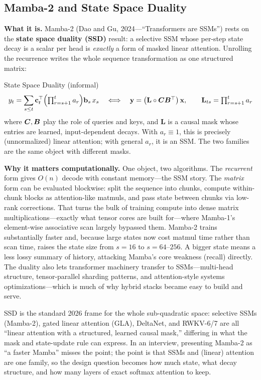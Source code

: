 \subsection{Mamba-2 and State Space Duality}
\label{subsec:mamba2_ssd}

\textbf{What it is.} Mamba-2 (Dao and Gu, 2024---``Transformers are SSMs'') rests on the \textbf{state space duality (SSD)} result: a selective SSM whose per-step state decay is a scalar per head is \textit{exactly} a form of masked linear attention. Unrolling the recurrence writes the whole sequence transformation as one structured matrix:

\begin{mathresult}{State Space Duality (informal)}
\begin{equation}
y_t = \sum_{s \le t} \mathbf{c}_t^{\top} \Bigl(\textstyle\prod_{r=s+1}^{t} a_r\Bigr) \mathbf{b}_s\, x_s
\quad\Longleftrightarrow\quad
\mathbf{y} = \bigl(\mathbf{L} \circ \bm{C} \bm{B}^{\top}\bigr)\, \mathbf{x}, \qquad \mathbf{L}_{ts} = \prod_{r=s+1}^{t} a_r
\end{equation}
where $\bm{C}, \bm{B}$ play the role of queries and keys, and $\mathbf{L}$ is a causal mask whose entries are learned, input-dependent decays. With $a_r \equiv 1$, this is precisely (unnormalized) linear attention; with general $a_r$, it is an SSM. The two families are the same object with different masks.
\end{mathresult}

\textbf{Why it matters computationally.} One object, two algorithms. The \textit{recurrent} form gives $O(n)$ decode with constant memory---the SSM story. The \textit{matrix} form can be evaluated blockwise: split the sequence into chunks, compute within-chunk blocks as attention-like matmuls, and pass state between chunks via low-rank corrections. That turns the bulk of training compute into dense matrix multiplications---exactly what tensor cores are built for---where Mamba-1's element-wise associative scan largely bypassed them. Mamba-2 trains substantially faster and, because large states now cost matmul time rather than scan time, raises the state size from $s = 16$ to $s = 64$--$256$. A bigger state means a less lossy summary of history, attacking Mamba's core weakness (recall) directly. The duality also lets transformer machinery transfer to SSMs---multi-head structure, tensor-parallel sharding patterns, and attention-style systems optimizations---which is much of why hybrid stacks became easy to build and serve.

\begin{keyinsight}
SSD is the standard 2026 frame for the whole sub-quadratic space: selective SSMs (Mamba-2), gated linear attention (GLA), DeltaNet, and RWKV-6/7 are all ``linear attention with a structured, learned causal mask,'' differing in what the mask and state-update rule can express. In an interview, presenting Mamba-2 as ``a faster Mamba'' misses the point; the point is that SSMs and (linear) attention are one family, so the design question becomes how much state, what decay structure, and how many layers of exact softmax attention to keep.
\end{keyinsight}

